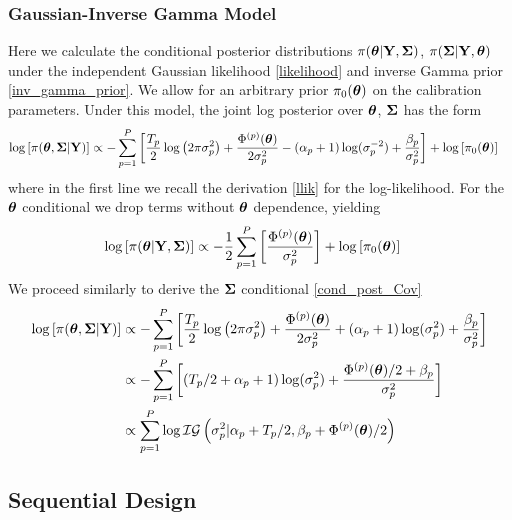 \documentclass[12pt]{article}
\begin{document}
\subsubsection{Gaussian-Inverse Gamma Model}
Here we calculate the conditional posterior distributions $\pi(\boldsymbol{\theta}|\mathbf{Y}, \boldsymbol{\Sigma})$, $\pi(\boldsymbol{\Sigma}|\mathbf{Y}, \boldsymbol{\theta})$ under the independent Gaussian 
likelihood \ref{likelihood} and inverse Gamma prior \ref{inv_gamma_prior}. We allow for an arbitrary prior $\pi_0(\boldsymbol{\theta})$ on the calibration parameters.
Under this model, the joint log posterior over $\boldsymbol{\theta}$, $\boldsymbol{\Sigma}$ has the form 
\begin{align*}
\log\left[\pi(\boldsymbol{\theta}, \boldsymbol{\Sigma}|\mathbf{Y})\right] &\propto -\sum_{p = 1}^{P} \left[\frac{T_{p}}{2} \log\left(2\pi \sigma_{p}^2 \right) + \frac{\Phi^{(p)}(\boldsymbol{\theta})}{2\sigma_{p}^2}  - (\alpha_{p} + 1)\log(\sigma_{p}^{-2}) + \frac{\beta_{p}}{\sigma_{p}^2} \right] + \log\left[\pi_0(\boldsymbol{\theta})\right] 
\end{align*}
where in the first line we recall the derivation \ref{llik} for the log-likelihood. For the $\boldsymbol{\theta}$ conditional we drop terms without $\boldsymbol{\theta}$ dependence, yielding
\begin{align*}
\log\left[\pi(\boldsymbol{\theta}|\mathbf{Y}, \boldsymbol{\Sigma})\right] &\propto -\frac{1}{2} \sum_{p = 1}^{P} \left[\frac{\Phi^{(p)}(\boldsymbol{\theta})}{\sigma_{p}^2}\right]  + \log\left[\pi_0(\boldsymbol{\theta})\right] 
\end{align*}
We proceed similarly to derive the $\boldsymbol{\Sigma}$ conditional \ref{cond_post_Cov}
\begin{align*}
\log\left[\pi(\boldsymbol{\theta}, \boldsymbol{\Sigma}|\mathbf{Y})\right] &\propto - \sum_{p = 1}^{P} \left[\frac{T_{p}}{2} \log\left(2\pi \sigma_{p}^2 \right) + \frac{\Phi^{(p)}(\boldsymbol{\theta})}{2\sigma_{p}^2}  + (\alpha_{p} + 1)\log(\sigma_{p}^{2}) + \frac{\beta_{p}}{\sigma_{p}^2} \right] \\
&\propto - \sum_{p = 1}^{P} \left[(T_{p}/2 + \alpha_{p} + 1)\log(\sigma_{p}^2) + \frac{\Phi^{(p)}(\boldsymbol{\theta})/2 + \beta_{p}}{\sigma_{p}^2} \right] \\
&\propto \sum_{p = 1}^{P} \log \mathcal{IG}\left(\sigma_{p}^2|\alpha_{p} + T_{p}/2, \beta_{p} + \Phi^{(p)}(\boldsymbol{\theta})/2 \right)
\end{align*}


\subsection{Sequential Design}
\end{document}
